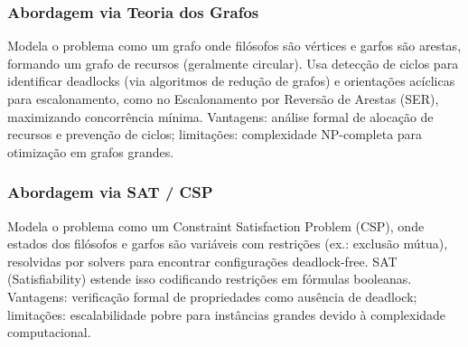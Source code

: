 \subsubsection{Abordagem via Teoria dos Grafos}
Modela o problema como um grafo onde filósofos são vértices e garfos são arestas, formando um grafo de recursos (geralmente circular). Usa detecção de ciclos para identificar deadlocks (via algoritmos de redução de grafos) e orientações acíclicas para escalonamento, como no Escalonamento por Reversão de Arestas (SER), maximizando concorrência mínima. Vantagens: análise formal de alocação de recursos e prevenção de ciclos; limitações: complexidade NP-completa para otimização em grafos grandes.

\subsubsection{Abordagem via SAT / CSP}
Modela o problema como um Constraint Satisfaction Problem (CSP), onde estados dos filósofos e garfos são variáveis com restrições (ex.: exclusão mútua), resolvidas por solvers para encontrar configurações deadlock-free. SAT (Satisfiability) estende isso codificando restrições em fórmulas booleanas. Vantagens: verificação formal de propriedades como ausência de deadlock; limitações: escalabilidade pobre para instâncias grandes devido à complexidade computacional.